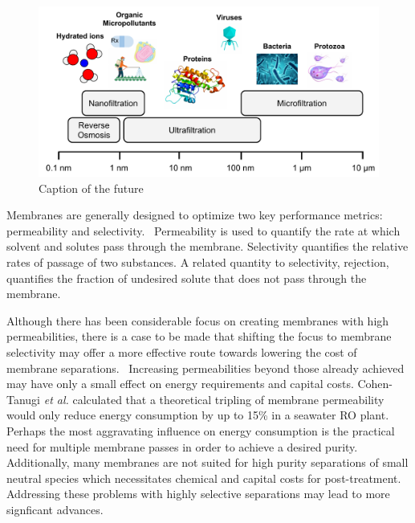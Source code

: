   \begin{figure}
  \centering
  \includegraphics[width=\textwidth]{figs/membrane_separation_size_regimes.pdf}
  \caption{Caption of the future}\label{fig:size_regimes}
  \end{figure}
  
  Membranes are generally designed to optimize two key performance metrics: 
  permeability and selectivity.~\cite{geise_water_2011} Permeability is used to
  quantify the rate at which solvent and solutes pass through the membrane.
  Selectivity quantifies the relative rates of passage of two substances.
  A related quantity to selectivity, rejection, quantifies the fraction
  of undesired solute that does not pass through the membrane.
   
  Although there has been considerable focus on creating membranes with high
  permeabilities, there is a case to be made that shifting the focus to membrane
  selectivity may offer a more effective route towards lowering the cost of 
  membrane separations.~\cite{werber_materials_2016} Increasing permeabilities
  beyond those already achieved may have only a small effect on energy 
  requirements and capital costs. Cohen-Tanugi \textit{et al.} calculated that 
  a theoretical tripling of membrane permeability would only reduce energy 
  consumption by up to 15\% in a seawater RO plant.~\cite{cohen-tanugi_quantifying_2014}
  Perhaps the most aggravating influence on energy consumption is the practical
  need for multiple membrane passes in order to achieve a desired purity.~\cite{singh_production_2009}
  Additionally, many membranes are not suited for high purity separations
  of small neutral species which necessitates chemical and capital costs for
  post-treatment.~\cite{shannon_science_2009,fritzmann_state---art_2007}
  Addressing these problems with highly selective separations may lead to 
  more signficant advances.~\cite{deshmukh_desalination_2015}
  
